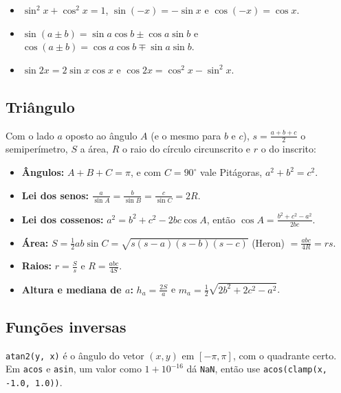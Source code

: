 \begin{itemize}
  \item $\sin^2 x + \cos^2 x = 1$, $\sin(-x) = -\sin x$ e $\cos(-x) = \cos x$.
  \item $\sin(a \pm b) = \sin a \cos b \pm \cos a \sin b$ e $\cos(a \pm b) = \cos a \cos b \mp \sin a \sin b$.
  \item $\sin 2x = 2 \sin x \cos x$ e $\cos 2x = \cos^2 x - \sin^2 x$.
\end{itemize}

\subsection*{Triângulo}

Com o lado $a$ oposto ao ângulo $A$ (e o mesmo para $b$ e $c$), $s = \frac{a + b + c}{2}$ o semiperímetro, $S$ a área,
$R$ o raio do círculo circunscrito e $r$ o do inscrito:
\begin{itemize}
  \item \textbf{Ângulos:} $A + B + C = \pi$, e com $C = 90^\circ$ vale Pitágoras, $a^2 + b^2 = c^2$.
  \item \textbf{Lei dos senos:} $\frac{a}{\sin A} = \frac{b}{\sin B} = \frac{c}{\sin C} = 2R$.
  \item \textbf{Lei dos cossenos:} $a^2 = b^2 + c^2 - 2bc \cos A$, então $\cos A = \frac{b^2 + c^2 - a^2}{2bc}$.
  \item \textbf{Área:} $S = \frac{1}{2} ab \sin C = \sqrt{s(s - a)(s - b)(s - c)}$ (Heron) $= \frac{abc}{4R} = rs$.
  \item \textbf{Raios:} $r = \frac{S}{s}$ e $R = \frac{abc}{4S}$.
  \item \textbf{Altura e mediana de $a$:} $h_a = \frac{2S}{a}$ e $m_a = \frac{1}{2}\sqrt{2b^2 + 2c^2 - a^2}$.
\end{itemize}

\subsection*{Funções inversas}

\texttt{atan2(y, x)} é o ângulo do vetor $(x, y)$ em $[-\pi, \pi]$, com o quadrante certo. Em \texttt{acos} e
\texttt{asin}, um valor como $1 + 10^{-16}$ dá \texttt{NaN}, então use \texttt{acos(clamp(x, -1.0, 1.0))}.
